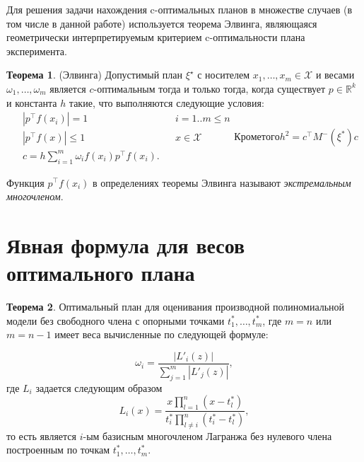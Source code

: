 \documentclass[specialist,
               substylefile = spbu.rtx,
               subf,href,colorlinks=true, 12pt]{disser}
\theoremstyle{definition}
\newtheorem{theorem}{Теорема}
\newcommand\abs[1]{\left\lvert#1\right\rvert}
\begin{document}
  Для решения задачи нахождения $\mathrm{c}$-оптимальных планов в множестве случаев (в том числе в данной работе) используется теорема Элвинга, являющаяся геометрически интерпретируемым критерием $\mathrm{c}$-оптимальности плана эксперимента.
  \begin{theorem}
  \label{th:elfving}
  (Элвинга) \cite{elfving1952}
  Допустимый план $\xi^\star$ с носителем $x_1, \ldots, x_m \in \mathcal{X}$ и весами $\omega_1, \ldots, \omega_m$ является $c$-оптимальным тогда и только тогда, когда существует $p \in \mathbb{R}^k$ и константа $h$ такие, что выполняются следующие условия:
  \begin{subequations}
  \label{eq:elfving}
  \begin{align}
	&\abs{p^\top f(x_i)} = 1 &&i=1..m \leqslant n \label{eq:elfving:eq1} \\
	&\abs{p^\top f(x)} \leqslant 1  &&x \in \mathcal{X} \label{eq:elfving:eq2} \\
	&c = h \sum_{i=1}^m \omega_i f(x_i) p^\top f(x_i) \label{eq:elfving:eq3}.
  \end{align}
  Кроме того
  \begin{equation*}
  	h^2 = c^\top M^{-}(\xi^{*})c
  \end{equation*}
  \end{subequations}
  \end{theorem}
	Функция $p^\top f(x_i)$ в определениях теоремы Элвинга называют \textit{экстремальным многочленом}.
	
	\section{Явная формула для весов оптимального плана}
	
	\begin{theorem}
	\label{th:weights}
	Оптимальный план для оценивания производной полиномиальной модели без свободного члена с опорными точками $t_1^*, \ldots, t_m^*$, где $m=n$ или $m=n-1$ имеет веса вычисленные по следующей формуле:	
	
	\begin{equation}
		\omega_i = \frac{\abs{L'_i(z)}}{\sum_{j=1}^m \abs{L'_j(z)}},
	\end{equation}
	где $L_i$ задается следующим образом
	\begin{equation*}
		L_{i}(x) = \frac{x \prod_{l=1}^n (x - t_l^*)}{t_i^* \prod_{l \neq i}^n (t_i^* - t_l^*)},
	\end{equation*}	
	то есть является $i$-ым базисным многочленом Лагранжа без нулевого члена построенным по точкам $t_1^*, \ldots, t_m^*$.
	\end{theorem}
	
\end{document}
